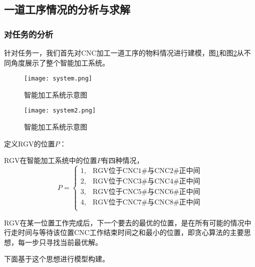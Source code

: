 \documentclass[no-math,withoutpreface,bwprint]{cumcmthesis} %
\numberwithin{equation}{section}
\numberwithin{figure}{section}
\numberwithin{table}{section}
\begin{document}
\subsection{一道工序情况的分析与求解}
\subsubsection{对任务的分析}
针对任务一，我们首先对CNC加工一道工序的物料情况进行建模，图\ref{figsys}和图\ref{figsys2}从不同角度展示了整个智能加工系统。
\begin{figure}[!htbp]
	\centering
	\texttt{[image: system.png]}
	\caption{智能加工系统示意图}
     \label{figsys}
\end{figure}

\begin{figure}[!htbp]
	\centering
	\texttt{[image: system2.png]}
	\caption{智能加工系统示意图}
     \label{figsys2}
\end{figure}

定义RGV的位置$P$：
\begin{definition}
RGV在智能加工系统中的位置$P$有四种情况，
\begin{equation}
P=\left\{\begin{array}{ll}
1,&\text{RGV位于CNC1\#与CNC2\#正中间}\\
2,&\text{RGV位于CNC3\#与CNC4\#正中间}\\
3,&\text{RGV位于CNC5\#与CNC6\#正中间}\\
4,&\text{RGV位于CNC7\#与CNC8\#正中间}\\
\end{array}\right.
\end{equation}
\end{definition}

RGV在某一位置工作完成后，下一个要去的最优的位置，是在所有可能的情况中行走时间与等待该位置CNC工作结束时间之和最小的位置，即贪心算法的主要思想，每一步只寻找当前最优解。

下面基于这个思想进行模型构建。
\end{document}
